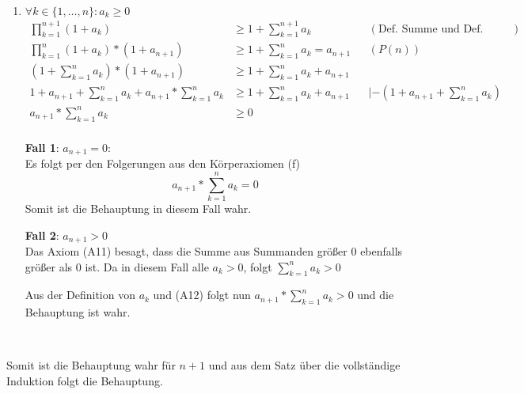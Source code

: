 \documentclass{article}
\begin{document}
\begin{enumerate}[label={Fall \arabic*}]
\newpage
\item $\forall k \in \{1, \ldots, n \} \colon a_k \geq 0$ \\  
  \begin{align*}
    \prod\limits_{k = 1}^{n + 1} (1 + a_k)                                            &\geq 1 + \sum\limits_{k = 1}^{n + 1} a_k       && (\text{Def. Summe und Def. Produkt})\\
    \prod\limits_{k = 1}^n (1 + a_k) * (1 + a_{n + 1})                                &\geq 1 + \sum\limits_{k = 1}^n a_k = a_{n + 1} && (P(n)) \\
    \left(1 + \sum\limits_{k = 1}^n a_k\right) * (1 + a_{n + 1})                      &\geq 1 + \sum\limits_{k = 1}^n a_k + a_{n + 1} \\
    1 + a_{n + 1} + \sum\limits_{k = 1}^n a_k + a_{n + 1} * \sum\limits_{k = 1}^n a_k &\geq 1 + \sum\limits_{k = 1}^n a_k + a_{n + 1} &&|  - \left(1 + a_{n + 1} + \sum\limits_{k = 1}^n a_k\right)\\
    a_{n + 1} * \sum\limits_{k = 1}^n a_k                                             &\geq 0 \\  
  \end{align*}

  \begin{minipage}[t]{.45\textwidth}
    \textbf{Fall 1}: $a_{n + 1} = 0$: \\
    
    Es folgt per den Folgerungen aus den Körperaxiomen (f)
    \[
      a_{n + 1} * \sum\limits_{k = 1}^n a_k = 0
    \]
    Somit ist die Behauptung in diesem Fall wahr.
  \end{minipage}
  \hfill
  \vrule
  \hfill
  \begin{minipage}[t]{.45\textwidth}
    \textbf{Fall 2}: $a_{n + 1} > 0$ \\
    
    Das Axiom (A11) besagt, dass die Summe aus Summanden größer $0$ ebenfalls größer als $0$ ist.
    Da in diesem Fall alle $a_k > 0$, folgt $\sum\limits_{k = 1}^n a_k > 0$
    
    Aus der Definition von $a_k$ und (A12) folgt nun $a_{n + 1} * \sum\limits_{k = 1}^n a_k > 0$ und
    die Behauptung ist wahr.
  \end{minipage} \\
\end{enumerate}

\noindent
Somit ist die Behauptung wahr für $n + 1$ und aus dem Satz über die vollständige Induktion folgt die Behauptung.
\end{document}

